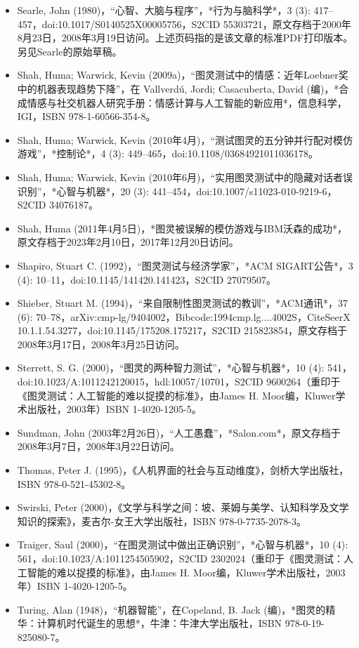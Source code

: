 \begin{itemize}
\item Searle, John (1980)，“心智、大脑与程序”，*行为与脑科学*，3 (3): 417–457，doi:10.1017/S0140525X00005756，S2CID 55303721，原文存档于2000年8月23日，2008年3月19日访问。上述页码指的是该文章的标准PDF打印版本。另见Searle的原始草稿。
\item Shah, Huma; Warwick, Kevin (2009a)，“图灵测试中的情感：近年Loebner奖中的机器表现趋势下降”，在 Vallverdú, Jordi; Casacuberta, David (编)，*合成情感与社交机器人研究手册：情感计算与人工智能的新应用*，信息科学，IGI，ISBN 978-1-60566-354-8。
\item Shah, Huma; Warwick, Kevin (2010年4月)，“测试图灵的五分钟并行配对模仿游戏”，*控制论*，4 (3): 449–465，doi:10.1108/03684921011036178。
\item Shah, Huma; Warwick, Kevin (2010年6月)，“实用图灵测试中的隐藏对话者误识别”，*心智与机器*，20 (3): 441–454，doi:10.1007/s11023-010-9219-6，S2CID 34076187。
\item Shah, Huma (2011年4月5日)，*图灵被误解的模仿游戏与IBM沃森的成功*，原文存档于2023年2月10日，2017年12月20日访问。
\item Shapiro, Stuart C. (1992)，“图灵测试与经济学家”，*ACM SIGART公告*，3 (4): 10–11，doi:10.1145/141420.141423，S2CID 27079507。
\item Shieber, Stuart M. (1994)，“来自限制性图灵测试的教训”，*ACM通讯*，37 (6): 70–78，arXiv:cmp-lg/9404002，Bibcode:1994cmp.lg....4002S，CiteSeerX 10.1.1.54.3277，doi:10.1145/175208.175217，S2CID 215823854，原文存档于2008年3月17日，2008年3月25日访问。
\item Sterrett, S. G. (2000)，“图灵的两种智力测试”，*心智与机器*，10 (4): 541，doi:10.1023/A:1011242120015，hdl:10057/10701，S2CID 9600264（重印于《图灵测试：人工智能的难以捉摸的标准》，由James H. Moor编，Kluwer学术出版社，2003年）ISBN 1-4020-1205-5。
\item Sundman, John (2003年2月26日)，“人工愚蠢”，*Salon.com*，原文存档于2008年3月7日，2008年3月22日访问。
\item Thomas, Peter J. (1995)，《人机界面的社会与互动维度》，剑桥大学出版社，ISBN 978-0-521-45302-8。
\item Swirski, Peter (2000)，《文学与科学之间：坡、莱姆与美学、认知科学及文学知识的探索》，麦吉尔-女王大学出版社，ISBN 978-0-7735-2078-3。
\item Traiger, Saul (2000)，“在图灵测试中做出正确识别”，*心智与机器*，10 (4): 561，doi:10.1023/A:1011254505902，S2CID 2302024（重印于《图灵测试：人工智能的难以捉摸的标准》，由James H. Moor编，Kluwer学术出版社，2003年）ISBN 1-4020-1205-5。
\item Turing, Alan (1948)，“机器智能”，在Copeland, B. Jack (编)，*图灵的精华：计算机时代诞生的思想*，牛津：牛津大学出版社，ISBN 978-0-19-825080-7。

\end{itemize}

